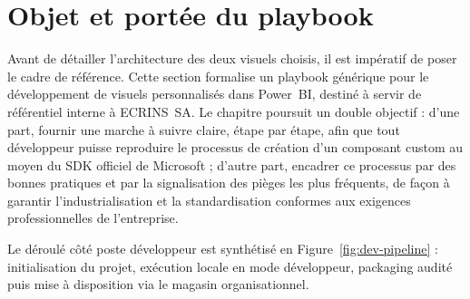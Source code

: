
\section{Objet et portée du playbook}
\label{sec:ch4_playbook_intro}

Avant de détailler l’architecture des deux visuels choisis, il est impératif de poser le cadre de référence. Cette section formalise un playbook générique pour le développement de visuels personnalisés dans Power~BI, destiné à servir de référentiel interne à ECRINS~SA. Le chapitre poursuit un double objectif : d’une part, fournir une marche à suivre claire, étape par étape, afin que tout développeur puisse reproduire le processus de création d’un composant custom au moyen du SDK officiel de Microsoft ; d’autre part, encadrer ce processus par des bonnes pratiques et par la signalisation des pièges les plus fréquents, de façon à garantir l’industrialisation et la standardisation conformes aux exigences professionnelles de l’entreprise.

Le déroulé côté poste développeur est synthétisé en Figure~\ref{fig:dev-pipeline} : initialisation du projet, exécution locale en mode développeur, packaging audité puis mise à disposition via le magasin organisationnel.

